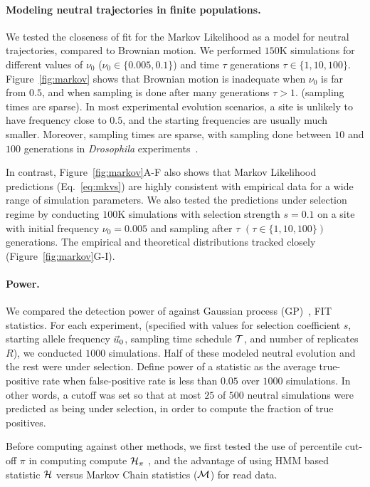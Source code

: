 \documentclass[11pt]{article}
\def\comale{\text{COMALE }}
\begin{document}
\paragraph{Modeling neutral trajectories in finite populations.} 
We tested the closeness of fit for the Markov Likelihood as a model
for neutral trajectories, compared to Brownian motion. We performed
$150$K simulations for different values of $\nu_0$
($\nu_0\in\{0.005,0.1\}$) and time $\tau$ generations $\tau\in
\{1,10,100\}$. Figure~\ref{fig:markov} shows that Brownian motion is
inadequate when $\nu_0$ is far from $0.5$, and when sampling is done
after many generations $\tau>1$. (sampling times are sparse). In most
experimental evolution scenarios, a site is unlikely to have frequency
close to $0.5$, and the starting frequencies are usually much
smaller. Moreover, sampling times are sparse, with sampling done
between $10$ and $100$ generations in \emph{Drosophila}
experiments~\cite{XXXSchottlerr, HAddad}.

In contrast, Figure~\ref{fig:markov}A-F also shows that Markov
Likelihood predictions (Eq.~\ref{eq:mkvs}) are highly consistent with
empirical data for a wide range of simulation parameters. We also
tested the predictions under selection regime by conducting $100$K
simulations with selection strength $s=0.1$ on a site with initial
frequency $\nu_0=0.005$ and sampling after $\tau$
$(\tau\in\{1,10,100\})$ generations. The empirical and theoretical
distributions tracked closely (Figure~\ref{fig:markov}G-I).

\paragraph{Power.} We compared the detection power of \comale against
Gaussian process (GP)~\cite{Terhorst2015Multi},
FIT~\cite{feder2014Identifying} statistics.  For each experiment,
(specified with values for selection coefficient $s$, starting allele
frequency $\vec{u}_0$, sampling time schedule ${\cal T}$, and number of
replicates $R$), we conducted $1000$ simulations. Half of these
modeled neutral evolution and the rest were under selection. Define
power of a statistic as the average true-positive rate when
false-positive rate is less than $0.05$ over $1000$ simulations. In
other words, a cutoff was set so that at most $25$ of $500$ neutral
simulations were predicted as being under selection, in order to
compute the fraction of true positives. 

Before computing against other methods, we first tested the use of
percentile cut-off $\pi$ in computing compute ${\cal H}_{\pi}$ , and the advantage of using HMM based statistic
${\cal H}$ versus Markov Chain statistics (${\cal M}$) for read data.
\end{document}
